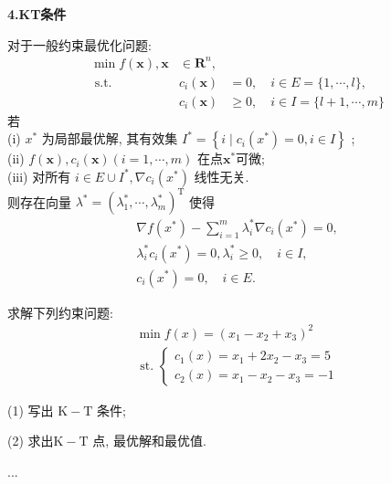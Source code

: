 \documentclass[cn]{elegantbook}
\begin{document}
\newpage
\begin{center}
 \textcolor[rgb]{0.33,0.33,1.00}{\huge \bf{4.KT条件}}
\end{center}

\begin{theorem}
  对于一般约束最优化问题:
$$
\begin{aligned}
\min f(\boldsymbol{x}), \boldsymbol{x} & \in \mathbf{R}^{n}, & \\
\text { s.t. } & c_{i}(\boldsymbol{x}) &=0, \quad i \in E=\{1, \cdots, l\}, \\
& c_{i}(\boldsymbol{x}) & \geqslant 0, \quad i \in I=\{l+1, \cdots, m\}
\end{aligned}
$$
 若\\
(i)  $x^{*}$  为局部最优解, 其有效集 $ I^{*}=\left\{i \mid c_{i}\left(x^{*}\right)=0, i \in I\right\}$ ;\\
(ii)  $f(\boldsymbol{x}), c_{i}(\boldsymbol{x})(i=1, \cdots, m)$  在点$  \boldsymbol{x}^{*}  $可微;\\
(iii) 对所有 $ i \in E \cup I^{*}, \nabla c_{i}\left(x^{*}\right)$  线性无关.\\
则存在向量  $\lambda^{*}=\left(\lambda_{1}^{*}, \cdots, \lambda_{m}^{*}\right)^{\mathrm{T}}$  使得
$$
\begin{array}{l}\displaystyle
\nabla f\left(x^{*}\right)-\sum_{i=1}^{m} \lambda_{i}^{*} \nabla c_{i}\left(x^{*}\right)=0, \\
\lambda_{i}^{*} c_{i}\left(x^{*}\right)=0,\lambda_{i}^{*} \geqslant 0, \quad i \in I , \\
c_{i}\left(x^{*}\right)=0,\quad i \in E .
\end{array}
$$
\end{theorem}
\begin{exercisez}
 求解下列约束问题:
$$
\begin{array}{l}
\min f(x)=\left(x_{1}-x_{2}+x_{3}\right)^{2} \\
\text { st. }\left\{\begin{array}{l}
c_{1}(x)=x_{1}+2 x_{2}-x_{3}=5 \\
c_{2}(x)=x_{1}-x_{2}-x_{3}=-1
\end{array}\right.
\end{array}
$$

(1) 写出  $\mathrm{K}-\mathrm{T}$  条件;

(2) 求出$  \mathrm{K}-\mathrm{T} $ 点, 最优解和最优值.
\end{exercisez}
\begin{solution}
...
\end{solution}
\end{document}
